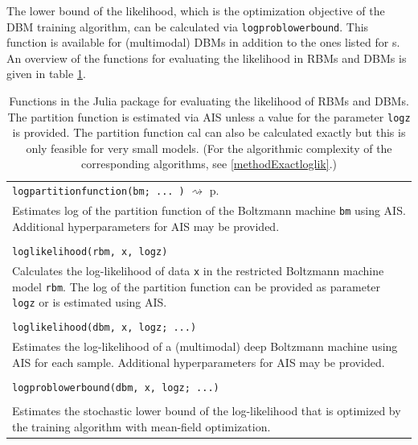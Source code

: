 \documentclass[12pt]{article}
\newcommand{\inlinecode}[1]{\texttt{#1}}
\newcommand{\rightpageref}[1]{\hfill $\rightsquigarrow$ p.\ \pageref{#1}}
\begin{document}
The lower bound of the likelihood, which is the optimization objective of the DBM training algorithm, can be calculated via \inlinecode{logproblowerbound}.
This function is available for (multimodal) DBMs in addition to the ones listed for s.
An overview of the functions for evaluating the likelihood in RBMs and DBMs is given in table \ref{juliaFunTableEval}.


\begin{table}[h]
\caption{Functions in the Julia package for evaluating the likelihood of RBMs and DBMs. The partition function is estimated via AIS unless a value for the parameter \inlinecode{logz} is provided. The partition function cal can also be calculated exactly but this is only feasible for very small models. (For the algorithmic complexity of the corresponding algorithms, see \ref{methodExactloglik}.) }
\label{juliaFunTableEval}
   \begin{tabularx}{\textwidth}{X}
 \Xhline{1pt}
   \inlinecode{logpartitionfunction(bm; ... )} \rightpageref{bms_logpartitionfunction}\\
   Estimates log of the partition function of the Boltzmann machine \inlinecode{bm} using AIS. Additional hyperparameters for AIS may be provided. \\
   \makecell[tl]{
      \inlinecode{loglikelihood(rbm, x)} \\
      \inlinecode{loglikelihood(rbm, x, logz)}
   } \rightpageref{bms_loglikelihood} \\
   Calculates the log-likelihood of data \inlinecode{x} in the restricted Boltzmann machine model \inlinecode{rbm}. The log of the partition function can be provided as parameter \inlinecode{logz} or is estimated using AIS. \\
   \makecell[tl]{
      \inlinecode{loglikelihood(dbm, x; ...)} \\
      \inlinecode{loglikelihood(dbm, x, logz; ...)}
   } \rightpageref{bms_loglikelihood} \\
   Estimates the log-likelihood of a (multimodal) deep Boltzmann machine using AIS for each sample. Additional hyperparameters for AIS may be provided. \\
   \makecell[tl]{ 
   	\inlinecode{logproblowerbound(dbm, x; ...)} \\
   	   	\inlinecode{logproblowerbound(dbm, x, logz; ...)} \\
   	} \rightpageref{bms_logproblowerbound} \\
   Estimates the stochastic lower bound of the log-likelihood that is optimized by the training algorithm with mean-field optimization. \\

\end{tabularx}
\end{table}
\end{document}
